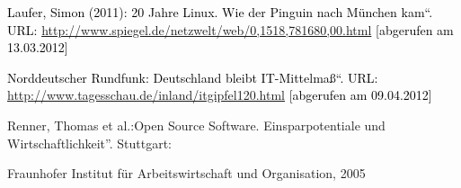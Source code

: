 \documentclass[a4paper]{article}
\newcommand\textstyleInternetlink[1]{\foreignlanguage{english}{\textcolor[rgb]{0.0,0.0,0.5019608}{#1}}}
\begin{document}
\bigskip

{
\textstyleInternetlink{\textcolor{black}{Laufer, Simon (2011):
{\quotedblbase}}}\textstyleInternetlink{\textcolor{black}{20 Jahre
Linux}}\textstyleInternetlink{\foreignlanguage{ngerman}{\textcolor{black}{.
}}}\textstyleInternetlink{\textcolor{black}{Wie}}\textstyleInternetlink{\textcolor{black}{
}}\textstyleInternetlink{\textcolor{black}{der}}\textstyleInternetlink{\textcolor{black}{
}}\textstyleInternetlink{\textcolor{black}{Pinguin}}\textstyleInternetlink{\textcolor{black}{
}}\textstyleInternetlink{\textcolor{black}{nach}}\textstyleInternetlink{\textcolor{black}{
}}\textstyleInternetlink{\textcolor{black}{M\"unchen}}\textstyleInternetlink{\textcolor{black}{
}}\textstyleInternetlink{\textcolor{black}{kam}}\textstyleInternetlink{\textcolor{black}{{\textquotedblleft}.
URL:}}\textstyleInternetlink{\textcolor{black}{
}}\url{http://www.spiegel.de/netzwelt/web/0,1518,781680,00.html}
\textstyleInternetlink{\textcolor{black}{[abgerufen am 13.03.2012]}}}


\bigskip

{
\textstyleInternetlink{\foreignlanguage{ngerman}{\textcolor{black}{Norddeutscher
Rundfunk}}}\textstyleInternetlink{\textcolor{black}{:
{\quotedblbase}Deutschland bleibt IT-Mittelma{\ss}{\textquotedblleft}.
URL:
}}\url{http://www.tagesschau.de/inland/itgipfel120.html}\textstyleInternetlink{\textcolor{black}{
[abgerufen am 09.04.2012]}}}


\bigskip

{
\foreignlanguage{english}{Renner,}\foreignlanguage{english}{
}\foreignlanguage{english}{Thomas}\foreignlanguage{english}{
}\foreignlanguage{english}{et}\foreignlanguage{english}{
}\foreignlanguage{english}{al.:}\foreignlanguage{english}{
{\quotedblbase}}\foreignlanguage{english}{Open}\foreignlanguage{english}{
}\foreignlanguage{english}{Source}\foreignlanguage{english}{
}\foreignlanguage{english}{Software}\foreignlanguage{english}{.
}Einsparpotentiale und Wirtschaftlichkeit{\textquotedblright}.
Stuttgart: }

{
Fraunhofer Institut f\"ur Arbeitswirtschaft und Organisation, 2005}


\bigskip
\end{document}
